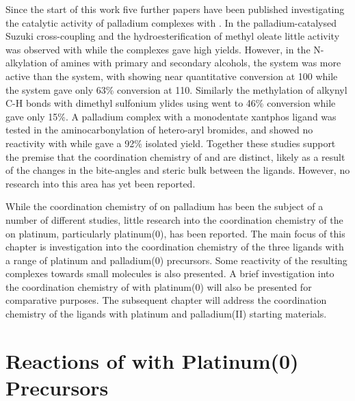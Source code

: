 Since the start of this work five further papers have been published investigating the catalytic activity of palladium complexes with \tBuxantphos{}.\cite{Ashcroft2013, Behr2013, Friis2014, Dang2013, Liu2013c}  In the palladium-catalysed Suzuki cross-coupling and the hydroesterification of methyl oleate little activity was observed with \tBuxantphos{} while the \Phxantphos{} complexes gave high yields.\cite{Ashcroft2013, Behr2013}  However, in the N-alkylation of amines with primary and secondary alcohols, the \tBuxantphos{} system was more active than the \Phxantphos{} system, with \tBuxantphos showing near quantitative conversion at 100\degC{} while the \Phxantphos{} system gave only 63\% conversion at 110\degC.  Similarly the methylation of alkynyl C-H bonds with dimethyl sulfonium ylides using \tBuxantphos{} went to 46\% conversion while \Phxantphos{} gave only 15\%.\cite{Liu2013c}  A palladium complex with a monodentate xantphos ligand was tested in the aminocarbonylation of hetero-aryl bromides, and showed no reactivity with \tBuxantphos{} while \Phxantphos gave a 92\% isolated yield.\cite{Friis2014}  Together these studies support the premise that the coordination chemistry of \tBuxantphos{} and \Phxantphos{} are distinct, likely as a result of the changes in the bite-angles and steric bulk between the ligands.  However, no research into this area has yet been reported. 

While the coordination chemistry of \Phxantphos{} on palladium has been the subject of a number of different studies, little research into the coordination chemistry of the \Phxantphos{} on platinum, particularly platinum(0), has been reported.\cite{Zuideveld2002, Raebiger2004, Bakhmutov2012, Miedaner2004, Klingensmith2006, Petocz2004, Yin2002}  The main focus of this chapter is investigation into the coordination chemistry of the three \tBuxantphos{} ligands with a range of  platinum and palladium(0) precursors.  Some reactivity of the resulting complexes towards small molecules is also presented.  A brief investigation into the coordination chemistry of \Phthixantphos{} with platinum(0) will also be presented for comparative purposes.  The subsequent chapter will address the coordination chemistry of the \tBuxantphos{} ligands with platinum and palladium(II) starting materials.  


\section{Reactions of \Phthixantphos{} with Platinum(0) Precursors}

